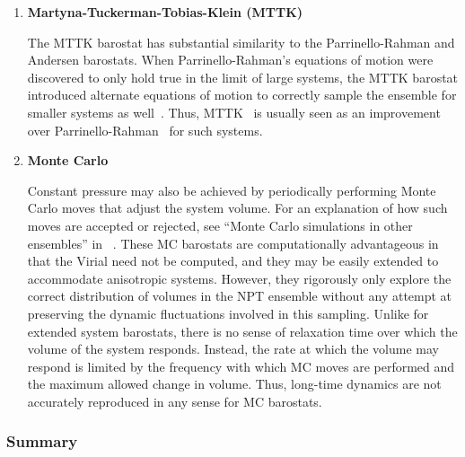 \documentclass[9pt,bestpractices]{livecoms}
\begin{document}
\begin{enumerate}[listparindent=\parindent]
    \item \textbf{Martyna-Tuckerman-Tobias-Klein (MTTK)}
    
        The MTTK barostat has substantial similarity to the Parrinello-Rahman and Andersen barostats.
        When Parrinello-Rahman's equations of motion were discovered to only hold true in the limit of large systems, the MTTK barostat introduced alternate equations of motion to correctly sample the ensemble for smaller systems as well~\cite{martyna1994constant, martyna1996explicit}.
        Thus, MTTK~\cite{martyna1994constant, martyna1996explicit} is usually seen as an improvement over Parrinello-Rahman~\cite{Parrinello1981} for such systems.

    \item \textbf{Monte Carlo}
    
        Constant pressure may also be achieved by periodically performing Monte Carlo moves that adjust the system volume.
        For an explanation of how such moves are accepted or rejected, see ``Monte Carlo simulations in other ensembles'' in ~\citet{ShellNotes}.
        These MC barostats are computationally advantageous in that the Virial need not be computed, and they may be easily extended to accommodate anisotropic systems.
        However, they rigorously only explore the correct distribution of volumes in the NPT ensemble without any attempt at preserving the dynamic fluctuations involved in this sampling.
        Unlike for extended system barostats, there is no sense of relaxation time over which the volume of the system responds.
        Instead, the rate at which the volume may respond is limited by the frequency with which MC moves are performed and the maximum allowed change in volume.
        Thus, long-time dynamics are not accurately reproduced in any sense for MC barostats.

\end{enumerate}

\subsubsection{Summary}
\end{document}
